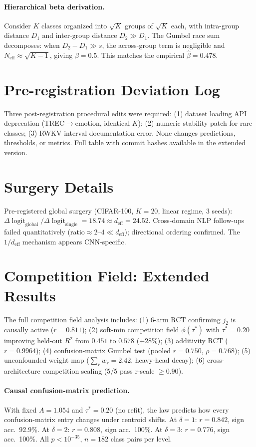 \documentclass{article}
\DeclareMathOperator{\logit}{logit}
\begin{document}
\paragraph{Hierarchical beta derivation.}
Consider $K$ classes organized into $\sqrt{K}$ groups of $\sqrt{K}$ each, with intra-group distance $D_1$ and inter-group distance $D_2\gg D_1$.
The Gumbel race sum decomposes: when $D_2-D_1\gg s$, the across-group term is negligible and $N_\mathrm{eff}\approx\sqrt{K-1}$, giving $\beta=0.5$. This matches the empirical $\hat\beta=0.478$.

\section{Pre-registration Deviation Log}
\label{app:prereg-deviations}
Three post-registration procedural edits were required: (1) dataset loading API deprecation (TREC$\to$emotion, identical $K$); (2) numeric stability patch for rare classes; (3) RWKV interval documentation error. None changes predictions, thresholds, or metrics. Full table with commit hashes available in the extended version.

\section{Surgery Details}
\label{app:surgery-details}
Pre-registered global surgery (CIFAR-100, $K=20$, linear regime, 3 seeds): $\Delta\logit_{\mathrm{global}}/\Delta\logit_{\mathrm{single}} = 18.74 \approx d_{\mathrm{eff}} = 24.52$. Cross-domain NLP follow-ups failed quantitatively (ratio$\approx2$--$4\ll d_{\mathrm{eff}}$); directional ordering confirmed. The $1/d_{\mathrm{eff}}$ mechanism appears CNN-specific.

\section{Competition Field: Extended Results}
\label{app:competition-field}

The full competition field analysis includes: (1) 6-arm RCT confirming $j_2$ is causally active ($r=0.811$); (2) soft-min competition field $\phi(\tau^*)$ with $\tau^*=0.20$ improving held-out $R^2$ from $0.451$ to $0.578$ (+28\%); (3) additivity RCT ($r=0.9964$); (4) confusion-matrix Gumbel test (pooled $r=0.750$, $\rho=0.768$); (5) unconfounded weight map ($\sum_r w_r=2.42$, heavy-head decay); (6) cross-architecture competition scaling (5/5 pass r-scale $\geq0.90$).

\paragraph{Causal confusion-matrix prediction.}
With fixed $A=1.054$ and $\tau^*=0.20$ (no refit), the law predicts how every confusion-matrix entry changes under centroid shifts. At $\delta=1$: $r=0.842$, sign acc.\ 92.9\%. At $\delta=2$: $r=0.808$, sign acc.\ 100\%. At $\delta=3$: $r=0.776$, sign acc.\ 100\%. All $p<10^{-35}$, $n=182$ class pairs per level.
\end{document}
